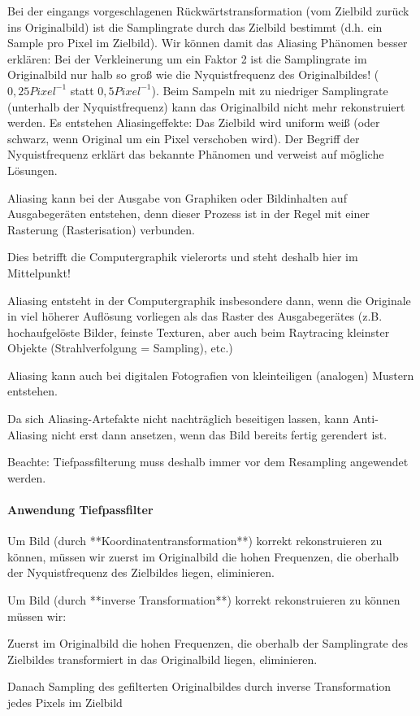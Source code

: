 \documentclass[landscape]{article}
\begin{document}
\begin{multicols}{3}
  Bei der eingangs vorgeschlagenen Rückwärtstransformation (vom Zielbild zurück ins Originalbild) ist die Samplingrate durch das Zielbild bestimmt (d.h. ein Sample pro Pixel im Zielbild). 
  Wir können damit das Aliasing Phänomen besser erklären: Bei der Verkleinerung um ein Faktor 2 ist die Samplingrate im Originalbild nur halb so groß wie die
  Nyquistfrequenz des Originalbildes! ($0,25 Pixel^{-1}$ statt $0,5 Pixel^{-1}$).
  Beim Sampeln mit zu niedriger Samplingrate (unterhalb der Nyquistfrequenz) kann das Originalbild nicht mehr rekonstruiert werden. Es entstehen Aliasingeffekte: Das Zielbild wird  uniform weiß (oder schwarz, wenn Original um ein Pixel verschoben wird).
  Der Begriff der Nyquistfrequenz erklärt das bekannte Phänomen und verweist auf mögliche Lösungen.
  
  Aliasing kann bei der Ausgabe von Graphiken oder Bildinhalten auf Ausgabegeräten entstehen, denn dieser Prozess ist in der Regel mit einer Rasterung (Rasterisation) verbunden.
  \begin{itemize*}
    \item Dies betrifft die Computergraphik vielerorts und steht deshalb hier im Mittelpunkt!
    \item Aliasing entsteht in der Computergraphik insbesondere dann, wenn die Originale in viel höherer Auflösung vorliegen als das Raster des Ausgabegerätes (z.B. hochaufgelöste Bilder, feinste Texturen, aber auch beim Raytracing kleinster Objekte (Strahlverfolgung = Sampling), etc.)
    \item Aliasing kann auch bei digitalen Fotografien von kleinteiligen (analogen) Mustern entstehen.
    \item Da sich Aliasing-Artefakte nicht nachträglich beseitigen lassen, kann Anti-Aliasing nicht erst dann ansetzen, wenn das Bild bereits fertig gerendert ist.
    \item Beachte: Tiefpassfilterung muss deshalb immer vor dem Resampling angewendet werden.
  \end{itemize*}
  
  \paragraph{Anwendung Tiefpassfilter}
  Um Bild (durch **Koordinatentransformation**) korrekt rekonstruieren zu können, müssen wir zuerst im Originalbild die hohen Frequenzen, die oberhalb der Nyquistfrequenz des Zielbildes liegen, eliminieren.
  
  Um Bild (durch **inverse Transformation**) korrekt rekonstruieren zu können müssen wir:
  \begin{itemize*}
    \item Zuerst im Originalbild die hohen Frequenzen, die oberhalb der Samplingrate des Zielbildes transformiert in das Originalbild liegen, eliminieren.
    \item Danach Sampling des gefilterten Originalbildes durch inverse Transformation jedes Pixels im Zielbild
  \end{itemize*}
  

\end{multicols}
\end{document}
